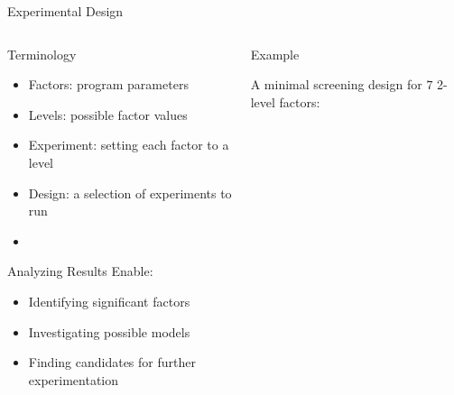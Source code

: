 \documentclass[10pt, compress, aspectratio=169, xcolor={table,usenames,dvipsnames}]{beamer}
\begin{document}
\begin{frame}[label={sec:org95f56c5}]{Experimental Design}
\begin{columns}
\begin{column}{0.5\columnwidth}
\begin{block}{Terminology}
\begin{itemize}
\item Factors: program parameters
\item Levels: possible factor values
\item Experiment: setting each factor to a level
\item Design: a selection of experiments to run
\item {}
\end{itemize}

\begin{block}{Analyzing Results Enable:}
\begin{itemize}
\item Identifying \alert{significant factors}
\item Investigating possible \alert{models}
\item Finding candidates for \alert{further experimentation}
\end{itemize}
\end{block}
\end{block}
\end{column}

\begin{column}{0.5\columnwidth}
\begin{block}{Example}
\vspace{-.2cm}
\begin{center}

A minimal screening design for \(7\) 2-level factors:

\end{center}
\vspace{-.2cm}


\vspace{-.2cm}

\end{block}
\end{column}
\end{columns}
\end{frame}
\end{document}
